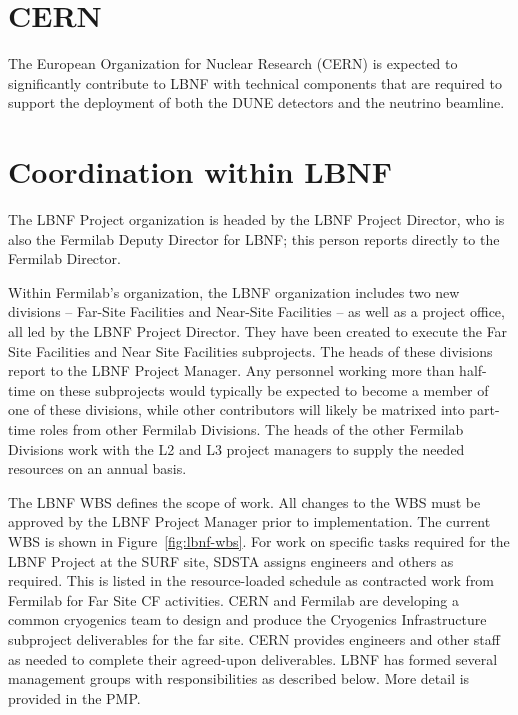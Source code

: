 \section{CERN}

The European Organization for Nuclear Research (CERN) is expected to significantly contribute to LBNF with technical components that are required to support the deployment of both the DUNE detectors and the neutrino beamline. 

\section{Coordination within LBNF}

The LBNF Project organization is headed by the LBNF Project Director, who is also the Fermilab Deputy Director for LBNF; this person reports directly to the Fermilab Director. 

Within Fermilab's organization, the LBNF organization includes two new divisions -- Far-Site Facilities and Near-Site Facilities -- as well as a project office, all led by the LBNF Project Director. They have been created to execute the Far Site Facilities and Near Site Facilities subprojects.
The heads of these divisions report to the LBNF Project Manager. 
Any personnel working more than half-time on these subprojects would typically be expected to become a member of one of these divisions, while other contributors will likely be matrixed into part-time roles from other Fermilab Divisions.  The heads of the other Fermilab Divisions work with the L2 and L3 project managers to supply the needed resources on an annual basis.    

The LBNF WBS defines the scope of work. All changes to the WBS must be approved by the LBNF Project Manager prior to implementation.   The current WBS is shown in Figure~\ref{fig:lbnf-wbs}. 
For work on specific tasks required for the LBNF Project at the SURF site, SDSTA assigns engineers and others as required. This is listed in the resource-loaded schedule as contracted work from Fermilab for Far Site CF activities. 
CERN and Fermilab are developing a common cryogenics team to design and produce the Cryogenics Infrastructure subproject deliverables for the far site. CERN provides engineers and other staff as needed to complete their agreed-upon deliverables.  
LBNF has formed several management groups with responsibilities as described below. More detail is provided in the PMP.

